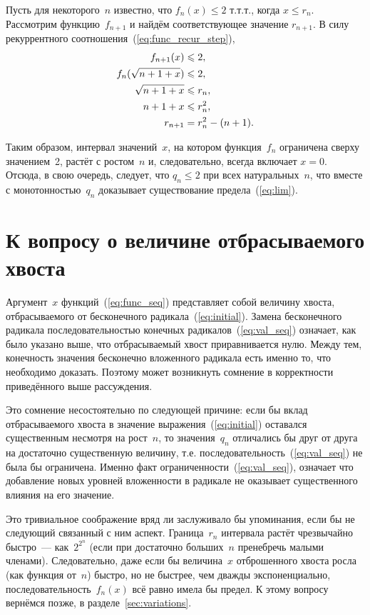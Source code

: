 \documentclass[12pt]{article}
\begin{document}
Пусть для некоторого~\(n\) известно, что \(f_n(x) \leqslant 2\) т.т.т., когда \(x\leqslant r_n\). Рассмотрим функцию~\(f_{n+1}\) и найдём соответствующее
значение \(r_{n+1}\). В силу рекуррентного соотношения~(\ref{eq:func_recur_step}),
\begin{align}
f_{n+1}(x) & \leqslant 2 , \notag \\
f_n(\sqrt{n + 1 + x}) & \leqslant 2 , \notag \\
\sqrt{n + 1 + x} & \leqslant r_n , \notag \\
n + 1 + x & \leqslant r^2_n , \notag \\
r_{n+1} & = r^2_n - (n + 1) . \label{eq:bound_recur}
\end{align}

Таким образом, интервал значений~\(x\), на котором функция~\(f_n\) ограничена сверху значением~2, растёт с ростом~\(n\) и, следовательно, всегда включает
\(x=0\).  Отсюда, в свою очередь, следует, что \(q_n \leqslant 2\) при всех натуральных~\(n\), что вместе с монотонностью~\(q_n\) доказывает существование
предела~(\ref{eq:lim}).

\section{К вопросу о величине отбрасываемого хвоста}

Аргумент~\(x\) функций~(\ref{eq:func_seq}) представляет собой величину хвоста, отбрасываемого от бесконечного радикала~(\ref{eq:initial}). Замена бесконечного
радикала последовательностью конечных радикалов~(\ref{eq:val_seq}) означает, как было указано выше, что отбрасываемый хвост приравнивается нулю. Между тем,
конечность значения бесконечно вложенного радикала есть именно то, что необходимо доказать. Поэтому может возникнуть сомнение в корректности приведённого выше
рассуждения.

Это сомнение несостоятельно по следующей причине: если бы вклад отбрасываемого хвоста в значение выражения~(\ref{eq:initial}) оставался существенным несмотря на
рост~\(n\), то значения~\(q_n\) отличались бы друг от друга на достаточно существенную величину, т.е. последовательность~(\ref{eq:val_seq}) не была бы
ограничена. Именно факт ограниченности~(\ref{eq:val_seq}), означает что добавление новых уровней вложенности в радикале не оказывает существенного влияния на
его значение.

Это тривиальное соображение вряд ли заслуживало бы упоминания, если бы не следующий связанный с ним аспект.  Граница~\(r_n\) интервала растёт чрезвычайно
быстро~--- как~\(2^{2^n}\) (если при достаточно больших~\(n\) пренебречь малыми членами). Следовательно, даже если бы величина~\(x\) отброшенного хвоста росла
(как функция от~\(n\)) быстро, но не быстрее, чем дважды экспоненциально, последовательность~\(f_n(x)\) всё равно имела бы предел. К этому вопросу вернёмся
позже, в разделе~\ref{sec:variations}.
\end{document}

